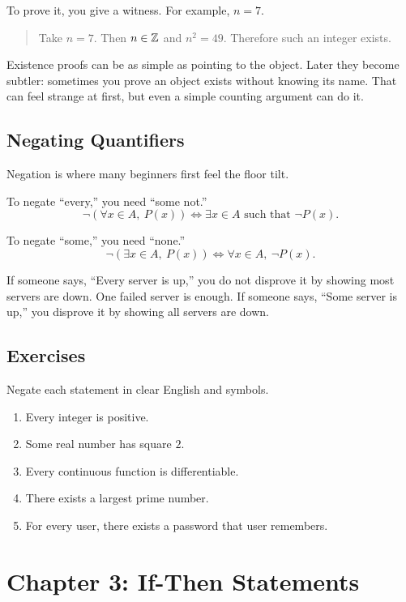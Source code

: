 \documentclass[11pt]{article}
\begin{document}
To prove it, you give a witness. For example, $n=7$.

\begin{quote}
Take $n=7$. Then $n\in\mathbb{Z}$ and $n^2=49$. Therefore such an integer exists.
\end{quote}

Existence proofs can be as simple as pointing to the object. Later they become subtler: sometimes you prove an object exists without knowing its name. That can feel strange at first, but even a simple counting argument can do it.

\subsection{Negating Quantifiers}

Negation is where many beginners first feel the floor tilt.

To negate ``every,'' you need ``some not.''
\[
\neg(\forall x\in A,\ P(x)) \Longleftrightarrow \exists x\in A \text{ such that } \neg P(x).
\]

To negate ``some,'' you need ``none.''
\[
\neg(\exists x\in A,\ P(x)) \Longleftrightarrow \forall x\in A,\ \neg P(x).
\]

If someone says, ``Every server is up,'' you do not disprove it by showing most servers are down. One failed server is enough. If someone says, ``Some server is up,'' you disprove it by showing all servers are down.

\subsection{Exercises}

Negate each statement in clear English and symbols.

\begin{enumerate}
\item Every integer is positive.
\item Some real number has square $2$.
\item Every continuous function is differentiable.
\item There exists a largest prime number.
\item For every user, there exists a password that user remembers.
\end{enumerate}

\section{Chapter 3: If-Then Statements}
\end{document}
